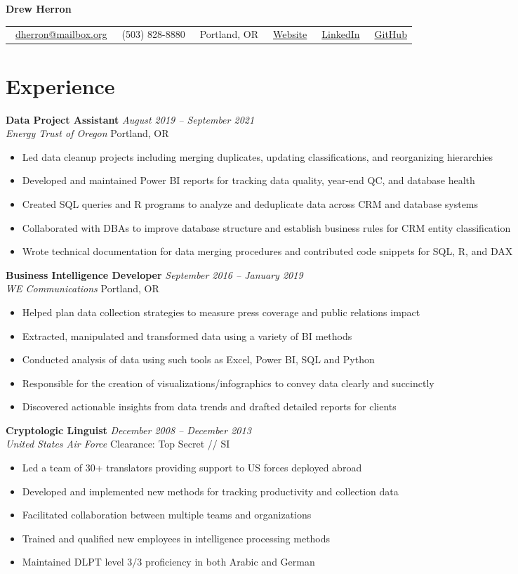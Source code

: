 \documentclass[letterpaper,11pt]{article}
\makeatletter
\newcommand{\contact}[6]{
  \begin{center}
    \begin{tabular*}{\textwidth}{@{\extracolsep{\fill}} l l l l l l}
      \faEnvelope\ \href{mailto:#1}{#1} & 
      \faPhone\ #2 & 
      \faMapMarker*\ #3 & 
      \faGlobe\ \href{#4}{Website} & 
      \faLinkedin\ \href{#5}{LinkedIn} &
      \faGithub\ \href{#6}{GitHub}
    \end{tabular*}
  \end{center}
}
\newcommand{\entry}[4]{
  \vspace{0.1em}
  \noindent\textbf{#1} \hfill \textit{#2}
  \\ \textit{#3} \hfill #4
  \vspace{0.3em}
}
\newcommand{\achievement}[1]{
  \vspace{-.5em}
  \item #1
}
\makeatother
\begin{document}
\begin{center}
  {\Huge\textbf{Drew Herron}}
\end{center}
  
  \contact
    {dherron@mailbox.org}
    {(503) 828-8880}
    {Portland, OR}
    {https://www.drewherron.com}
    {https://www.linkedin.com/in/drew-herron}
    {https://github.com/drewherron}

\section{Experience}

\entry{Data Project Assistant}{August 2019 -- September 2021}{Energy Trust of Oregon}{Portland, OR}
\begin{itemize}[leftmargin=*]
  \achievement{Led data cleanup projects including merging duplicates, updating classifications, and reorganizing hierarchies}
  \achievement{Developed and maintained Power BI reports for tracking data quality, year-end QC, and database health}
  \achievement{Created SQL queries and R programs to analyze and deduplicate data across CRM and database systems}
  \achievement{Collaborated with DBAs to improve database structure and establish business rules for CRM entity classification}
  \achievement{Wrote technical documentation for data merging procedures and contributed code snippets for SQL, R, and DAX}
\end{itemize}

\entry{Business Intelligence Developer}{September 2016 -- January 2019}{WE Communications}{Portland, OR}
\begin{itemize}[leftmargin=*]
  \achievement{Helped plan data collection strategies to measure press coverage and public relations impact}
  \achievement{Extracted, manipulated and transformed data using a variety of BI methods}
  \achievement{Conducted analysis of data using such tools as Excel, Power BI, SQL and Python}
  \achievement{Responsible for the creation of visualizations/infographics to convey data clearly and succinctly}
  \achievement{Discovered actionable insights from data trends and drafted detailed reports for clients}
\end{itemize}

\entry{Cryptologic Linguist}{December 2008 -- December 2013}{United States Air Force}{Clearance: Top Secret // SI}
\begin{itemize}[leftmargin=*]
  \achievement{Led a team of 30+ translators providing support to US forces deployed abroad}
  \achievement{Developed and implemented new methods for tracking productivity and collection data}
  \achievement{Facilitated collaboration between multiple teams and organizations}
  \achievement{Trained and qualified new employees in intelligence processing methods}
  \achievement{Maintained DLPT level 3/3 proficiency in both Arabic and German}
\end{itemize}
\end{document}
